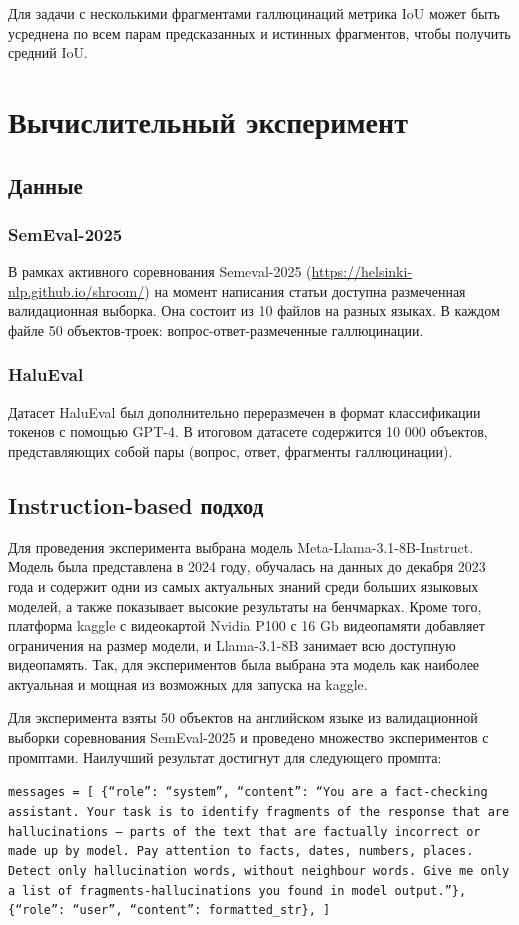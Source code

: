 \documentclass[12pt]{article}
\begin{document}
Для задачи с несколькими фрагментами галлюцинаций метрика IoU может быть усреднена по всем парам предсказанных и истинных фрагментов, чтобы получить средний IoU. 



 
\section{Вычислительный эксперимент}
\subsection{Данные}
\subsubsection{SemEval-2025}
В рамках активного соревнования Semeval-2025 (\url{https://helsinki-nlp.github.io/shroom/}) на момент написания статьи доступна размеченная валидационная выборка. Она состоит из 10 файлов на разных языках. В каждом файле 50 объектов-троек: вопрос-ответ-размеченные галлюцинации.
\subsubsection{HaluEval}
Датасет HaluEval был дополнительно переразмечен в формат классификации токенов с помощью GPT-4. В итоговом датасете содержится 10 000 объектов, представляющих собой пары (вопрос, ответ, фрагменты галлюцинации).

\subsection{Instruction-based подход}
Для проведения эксперимента выбрана модель Meta-Llama-3.1-8B-Instruct. Модель была представлена в 2024 году, обучалась на данных до декабря 2023 года и содержит одни из самых актуальных знаний среди больших языковых моделей, а также показывает высокие результаты на бенчмарках. Кроме того, платформа kaggle с видеокартой Nvidia P100 с 16 Gb видеопамяти добавляет ограничения на размер модели, и Llama-3.1-8B занимает всю доступную видеопамять. Так, для экспериментов была выбрана эта модель как наиболее актуальная и мощная из возможных для запуска на kaggle.

Для эксперимента взяты 50 объектов на английском языке из валидационной выборки соревнования SemEval-2025 и проведено множество экспериментов с промптами. Наилучший результат достигнут для следующего промпта:

\texttt{messages = [
    \{``role'': ``system'', ``content'': ``You are a fact-checking assistant. Your task is to identify fragments of the response that are hallucinations -- parts of the text that are factually incorrect or made up by model. Pay attention to facts, dates, numbers, places. Detect only hallucination words, without neighbour words. Give me only a list of fragments-hallucinations you found in model output.''\},
    \{``role'': ``user'', ``content'': formatted\_str\},
]}
\end{document}
